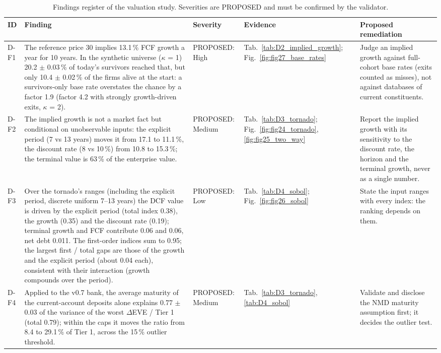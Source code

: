 \begin{table}[H]
\centering
\scriptsize
\caption{Findings register of the valuation study. Severities are PROPOSED and must be confirmed by the validator.}
\label{tab:D6_findings}
\setlength{\tabcolsep}{3pt}
\begin{tabular}{>{\raggedright\arraybackslash}p{0.75cm}>{\raggedright\arraybackslash}p{6.6cm}>{\raggedright\arraybackslash}p{1.85cm}>{\raggedright\arraybackslash}p{2.4cm}>{\raggedright\arraybackslash}p{3.5cm}}
\toprule
ID & Finding & Severity & Evidence & Proposed remediation \\
\midrule
D-F1 & The reference price 30 implies 13.1\,\% FCF growth a year for 10 years. In the synthetic universe ($\kappa$ = 1) 20.2 $\pm$ 0.03\,\% of today's survivors reached that, but only 10.4 $\pm$ 0.02\,\% of the firms alive at the start: a survivors-only base rate overstates the chance by a factor 1.9 (factor 4.2 with strongly growth-driven exits, $\kappa$ = 2). & PROPOSED: High & Tab.~\ref{tab:D2_implied_growth}; Fig.~\ref{fig:fig27_base_rates} & Judge an implied growth against full-cohort base rates (exits counted as misses), not against databases of current constituents. \\
D-F2 & The implied growth is not a market fact but conditional on unobservable inputs: the explicit period (7 vs 13 years) moves it from 17.1 to 11.1\,\%, the discount rate (8 vs 10\,\%) from 10.8 to 15.3\,\%; the terminal value is 63\,\% of the enterprise value. & PROPOSED: Medium & Tab.~\ref{tab:D3_tornado}; Fig.~\ref{fig:fig24_tornado}, \ref{fig:fig25_two_way} & Report the implied growth with its sensitivity to the discount rate, the horizon and the terminal growth, never as a single number. \\
D-F3 & Over the tornado's ranges (including the explicit period, discrete uniform 7--13 years) the DCF value is driven by the explicit period (total index 0.38), the growth (0.35) and the discount rate (0.19); terminal growth and FCF contribute 0.06 and 0.06, net debt 0.011. The first-order indices sum to 0.95; the largest first / total gaps are those of the growth and the explicit period (about 0.04 each), consistent with their interaction (growth compounds over the period). & PROPOSED: Low & Tab.~\ref{tab:D4_sobol}; Fig.~\ref{fig:fig26_sobol} & State the input ranges with every index: the ranking depends on them. \\
D-F4 & Applied to the v0.7 bank, the average maturity of the current-account deposits alone explains 0.77 $\pm$ 0.03 of the variance of the worst $\Delta$EVE / Tier 1 (total 0.79); within the caps it moves the ratio from 8.4 to 29.1\,\% of Tier 1, across the 15\,\% outlier threshold. & PROPOSED: Medium & Tab.~\ref{tab:D3_tornado}, \ref{tab:D4_sobol} & Validate and disclose the NMD maturity assumption first; it decides the outlier test. \\

\end{tabular}
\end{table}
